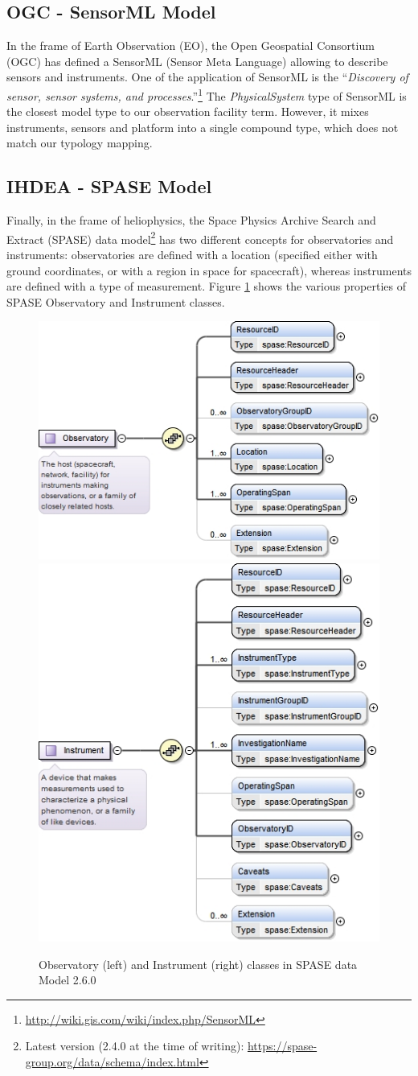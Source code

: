 \documentclass[11pt,a4paper]{ivoa}
\begin{document}
\subsection{OGC - SensorML Model}
In the frame of Earth Observation (EO), the Open Geospatial Consortium
(OGC) has defined a SensorML (Sensor Meta Language) \citep{ogc-sensorml} 
allowing to describe sensors and instruments. One of the application of 
SensorML is the ``\emph{Discovery of sensor, sensor systems, and
processes}.''\footnote{\url{http://wiki.gis.com/wiki/index.php/SensorML}} 
The \emph{PhysicalSystem} type of SensorML is the closest model type to
our observation facility term.  However, it mixes instruments, sensors 
and platform into a single compound type, which does not match our 
typology mapping. 

\subsection{IHDEA - SPASE Model}
\label{appendx:models:spase}
Finally, in the frame of heliophysics, the Space Physics Archive Search
and Extract (SPASE) data model\footnote{Latest version (2.4.0 at the 
time of writing): \url{https://spase-group.org/data/schema/index.html}} 
\citep{Roberts:2018bi,spase-model} has two different
concepts for observatories and instruments: observatories are defined 
with a location (specified either with ground coordinates, or with a 
region in space for spacecraft), whereas instruments are defined with 
a type of measurement. Figure \ref{fig:spase-observatory} shows the 
various properties of SPASE Observatory and Instrument classes.

\begin{figure}
{\centering\includegraphics[align=c,width=0.49\linewidth]{spase-2_6_0_xsd_Complex_Type_spase_Observatory.jpg}
\includegraphics[align=c,width=0.49\linewidth]{spase-2_6_0_xsd_Complex_Type_spase_Instrument.jpg}}
\caption{Observatory (left) and Instrument (right) classes in SPASE data Model 2.6.0}\label{fig:spase-observatory}
\end{figure}
\end{document}
